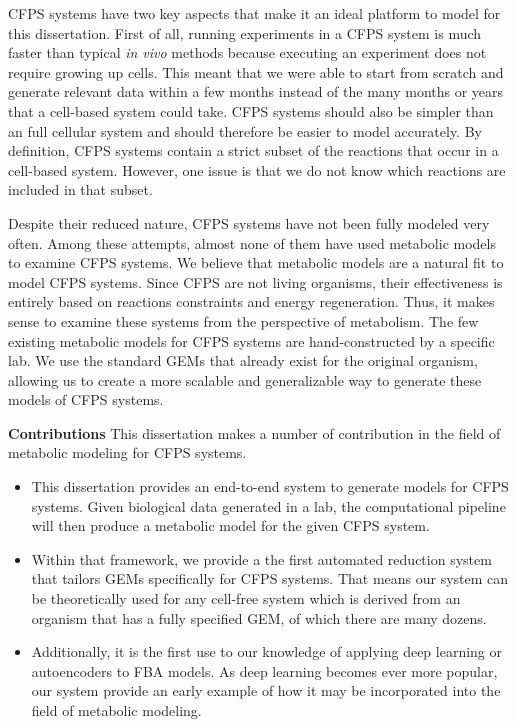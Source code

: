 CFPS systems have two key aspects that make it an ideal platform to model for this dissertation.
First of all, running experiments in a CFPS system is much faster than typical \textit{in vivo} methods because executing an experiment does not require growing up cells.
This meant that we were able to start from scratch and generate relevant data within a few months instead of the many months or years that a cell-based system could take.
CFPS systems should also be simpler than an full cellular system and should therefore be easier to model accurately.
By definition, CFPS systems contain a strict subset of the reactions that occur in a cell-based system.
However, one issue is that we do not know which reactions are included in that subset.

Despite their reduced nature, CFPS systems have not been fully modeled very often.
Among these attempts, almost none of them have used metabolic models to examine CFPS systems.
We believe that metabolic models are a natural fit to model CFPS systems.
Since CFPS are not living organisms, their effectiveness is entirely based on reactions constraints and energy regeneration.
Thus, it makes sense to examine these systems from the perspective of metabolism.
The few existing metabolic models for CFPS systems are hand-constructed by a specific lab.
We use the standard GEMs that already exist for the original organism, allowing us to create a more scalable and generalizable way to generate these models of CFPS systems.

\textbf{Contributions}
This dissertation makes a number of contribution in the field of metabolic modeling for CFPS systems.
\begin{itemize}
\item This dissertation provides an end-to-end system to generate models for CFPS systems.
Given biological data generated in a lab, the computational pipeline will then produce a metabolic model for the given CFPS system.
\item Within that framework, we provide a the first automated reduction system that tailors GEMs specifically for CFPS systems.
That means our system can be theoretically used for any cell-free system which is derived from an organism that has a fully specified GEM, of which there are many dozens.
\item Additionally, it is the first use to our knowledge of applying deep learning or autoencoders to FBA models.
As deep learning becomes ever more popular, our system provide an early example of how it may be incorporated into the field of metabolic modeling.
\end{itemize}

